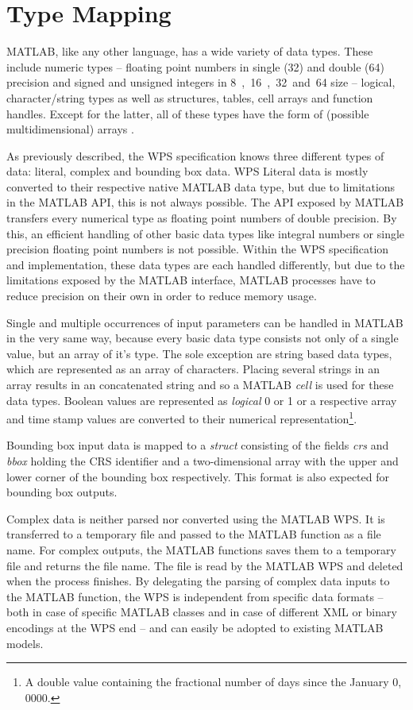 \section{Type Mapping}
  \label{sec:matlab:type}
  MATLAB, like any other language, has a wide variety of data types. These include numeric types -- floating point numbers in single (\unit{32}{\bit}) and double (\unit{64}{\bit}) precision and signed and unsigned integers in \unit{8, 16, 32 and 64}{\bit} size -- logical, character/string types as well as structures, tables, cell arrays and function handles. Except for the latter, all of these types have the form of (possible multidimensional) arrays \citep{matlab}.

  As previously described, the \acl{WPS} specification knows three different types of data: literal, complex and bounding box data.
  \ac{WPS} Literal data is mostly converted to their respective native MATLAB data type, but due to limitations in the MATLAB \ac{API}, this is not always possible. The \ac{API} exposed by MATLAB transfers every numerical type as floating point numbers of double precision. By this, an efficient handling of other basic data types like integral numbers or single precision floating point numbers is not possible. Within the WPS specification and implementation, these data types are each handled differently, but due to the limitations exposed by the MATLAB interface, MATLAB processes have to reduce precision on their own in order to reduce memory usage.

  Single and multiple occurrences of input parameters can be handled in MATLAB in the very same way, because every basic data type consists not only of a single value, but an array of it's type. The sole exception are string based data types, which are represented as an array of characters. Placing several strings in an array results in an concatenated string and so a MATLAB \emph{cell} is used for these data types. Boolean values are represented as \emph{logical} 0 or 1 or a respective array and time stamp values are converted to their numerical representation\footnote{A double value containing the fractional number of days since the January 0, 0000.}.

  Bounding box input data is mapped to a \emph{struct} consisting of the fields \emph{crs} and \emph{bbox} holding the \ac{CRS} identifier and a two-dimensional array with the upper and lower corner of the bounding box respectively. This format is also expected for bounding box outputs.

  Complex data is neither parsed nor converted using the MATLAB WPS. It is transferred to a temporary file and passed to the MATLAB function as a file name. For complex outputs, the MATLAB functions saves them to a temporary file and returns the file name. The file is read by the MATLAB WPS and deleted when the process finishes. By delegating the parsing of complex data inputs to the MATLAB function, the WPS is independent from specific data formats -- both in case of specific MATLAB classes and in case of different XML or binary encodings at the WPS end -- and can easily be adopted to existing MATLAB models.

